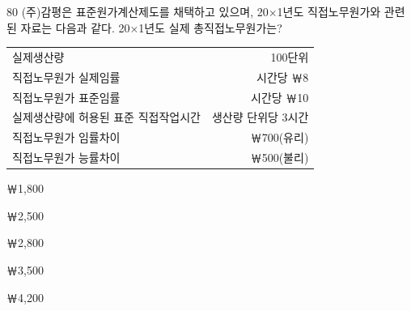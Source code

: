 \begin{question}{80}
(주)감평은 표준원가계산제도를 채택하고 있으며, 20×1년도 직접노무원가와 관련된 자료는 다음과 같다. 20×1년도 실제 총직접노무원가는?
\begin{framedtext}
{\small\begin{tabular}{@{}lr@{}}
실제생산량 & 100단위 \\
직접노무원가 실제임률 & 시간당 ￦8 \\
직접노무원가 표준임률 & 시간당 ￦10 \\
실제생산량에 허용된 표준 직접작업시간 & 생산량 단위당 3시간 \\
직접노무원가 임률차이 & ￦700(유리) \\
직접노무원가 능률차이 & ￦500(불리) \\
\end{tabular}\par}
\end{framedtext}
\begin{choices}
  \item ￦1,800
  \item ￦2,500
  \item ￦2,800
  \item ￦3,500
  \item ￦4,200
\end{choices}
\end{question}
